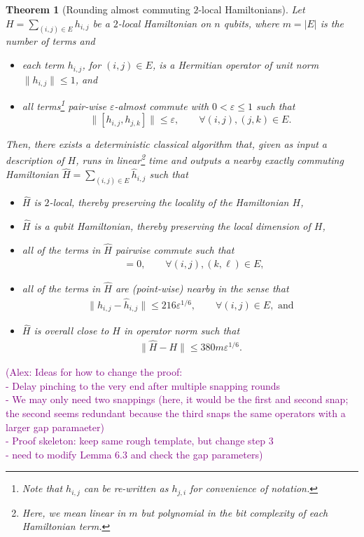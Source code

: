 \documentclass[11pt]{article}
\theoremstyle{plain}
\newtheorem{theorem}{Theorem}[section]
\newcommand{\eps}{\varepsilon}
\newcommand{\AlexNote}[1]{\textcolor{purple}{(Alex: #1)}}
\newcommand{\AlexNote}[1]{}
\begin{document}
\begin{theorem}[Rounding almost commuting $2$-local Hamiltonians]\label{thm:transforming-hamiltonian}
Let $H=\sum_{(i,j) \in E} h_{i,j}$ be a $2$-local 
Hamiltonian on $n$ qubits, where $m = |E|$ is the number of terms and
\begin{itemize}
    \item each term $h_{i,j}$, for $(i,j)\in E$, is a Hermitian operator of unit norm $\| h_{i,j} \| \leq 1$, and
    \item all terms\footnote{Note that $h_{i,j}$ can be re-written as $h_{j,i}$ for convenience of notation.} pair-wise $\eps$-almost commute with $0 < \eps \leq 1$ such that
\[ \| [h_{i,j}, h_{j,k} ] \| \leq \eps, \quad\quad \forall(i,j), (j,k) \in E. \]
\end{itemize}
Then, there exists a deterministic classical algorithm that, given as input a description of $H$, runs 
in linear\footnote{Here, we mean linear in $m$ but polynomial in the bit complexity of each Hamiltonian term.} time  and outputs a nearby exactly commuting Hamiltonian $\hat{H} = \sum_{(i,j) \in E} \hat{h}_{i,j}$ such that 
\begin{itemize}
\item $\hat{H}$ is $2$-local, thereby preserving the locality of the Hamiltonian $H$,
\item $\hat{H}$ is a qubit Hamiltonian, thereby preserving the local dimension of $H$,
    \item all of the terms in $\hat{H}$ pairwise commute such that
    \begin{align} 
[\hat{h}_{i,j}, \hat{h}_{k,\ell}] &= 0, \quad\quad \forall (i,j), (k,\ell) \in E, \label{eq:exact-commutation}
\end{align}
\item all of the terms in $\hat{H}$ are (point-wise) nearby in the sense that 
\begin{align}
\| h_{i,j} - \hat{h}_{i,j} \| \leq 216 \eps^{1/6}, \quad\quad \forall (i,j) \in E, \text{ and}\label{eq:overall-rounding-term-error}
\end{align}
\item $\hat{H}$ is overall close to $H$ in operator norm such that
\begin{align}
\|\hat{H} - H\| \leq 380 m \eps^{1/6}.\label{eq:rounding-error}
\end{align}
\end{itemize}
\end{theorem}

\AlexNote{Ideas for how to change the proof:\\
- Delay pinching to the very end after multiple snapping rounds\\
- We may only need two snappings (here, it would be the first and second snap; the second seems redundant because the third snaps the same operators with a larger gap paramaeter)\\
- Proof skeleton: keep same rough template, but change step 3\\
- need to modify Lemma 6.3 and check the gap parameters}
\end{document}

